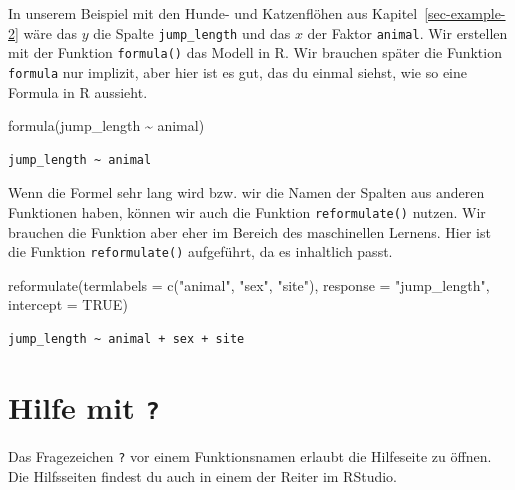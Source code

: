 \documentclass[
  letterpaper,
  DIV=11,
  oneside]{scrreport}
\newenvironment{Shaded}{\begin{snugshade}}{\end{snugshade}}
\newcommand{\AttributeTok}[1]{\textcolor[rgb]{0.40,0.45,0.13}{#1}}
\newcommand{\ConstantTok}[1]{\textcolor[rgb]{0.56,0.35,0.01}{#1}}
\newcommand{\FunctionTok}[1]{\textcolor[rgb]{0.28,0.35,0.67}{#1}}
\newcommand{\NormalTok}[1]{\textcolor[rgb]{0.00,0.23,0.31}{#1}}
\newcommand{\SpecialCharTok}[1]{\textcolor[rgb]{0.37,0.37,0.37}{#1}}
\newcommand{\StringTok}[1]{\textcolor[rgb]{0.13,0.47,0.30}{#1}}
\begin{document}
In unserem Beispiel mit den Hunde- und Katzenflöhen aus
Kapitel~\ref{sec-example-2} wäre das \(y\) die Spalte
\texttt{jump\_length} und das \(x\) der Faktor \texttt{animal}. Wir
erstellen mit der Funktion \texttt{formula()} das Modell in R. Wir
brauchen später die Funktion \texttt{formula} nur implizit, aber hier
ist es gut, das du einmal siehst, wie so eine Formula in R aussieht.

\begin{Shaded}
\begin{Highlighting}[]
\FunctionTok{formula}\NormalTok{(jump\_length }\SpecialCharTok{\textasciitilde{}}\NormalTok{ animal)}
\end{Highlighting}
\end{Shaded}

\begin{verbatim}
jump_length ~ animal
\end{verbatim}

Wenn die Formel sehr lang wird bzw. wir die Namen der Spalten aus
anderen Funktionen haben, können wir auch die Funktion
\texttt{reformulate()} nutzen. Wir brauchen die Funktion aber eher im
Bereich des maschinellen Lernens. Hier ist die Funktion
\texttt{reformulate()} aufgeführt, da es inhaltlich passt.

\begin{Shaded}
\begin{Highlighting}[]
\FunctionTok{reformulate}\NormalTok{(}\AttributeTok{termlabels =} \FunctionTok{c}\NormalTok{(}\StringTok{"animal"}\NormalTok{, }\StringTok{"sex"}\NormalTok{, }\StringTok{"site"}\NormalTok{),}
            \AttributeTok{response =} \StringTok{"jump\_length"}\NormalTok{,}
            \AttributeTok{intercept =} \ConstantTok{TRUE}\NormalTok{)}
\end{Highlighting}
\end{Shaded}

\begin{verbatim}
jump_length ~ animal + sex + site
\end{verbatim}

\hypertarget{sec-R-help}{%
\section{\texorpdfstring{Hilfe mit
\texttt{?}}{Hilfe mit ?}}\label{sec-R-help}}

Das Fragezeichen \texttt{?} vor einem Funktionsnamen erlaubt die
Hilfeseite zu öffnen. Die Hilfsseiten findest du auch in einem der
Reiter im RStudio.
\end{document}

